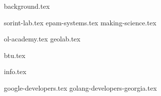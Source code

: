 \documentclass[11pt]{article}
\begin{document}
{background.tex}

{sorint-lab.tex}
{epam-systems.tex}
{making-science.tex}

{ol-academy.tex}
{geolab.tex}

{btu.tex}

{info.tex}

{google-developers.tex}
{golang-developers-georgia.tex}
\end{document}
